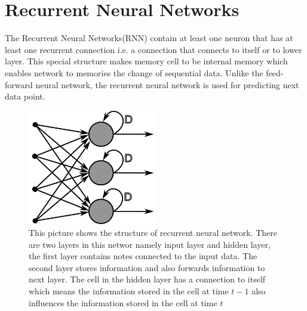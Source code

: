 \documentclass[officiallayout]{tktla}
\begin{document}
\section{Recurrent Neural Networks}
The Recurrent Neural Networks(RNN) contain at least one neuron that has at least one recurrent connection i.e. a connection that connects to itself or to lower layer. This special structure makes memory cell to be internal memory which enables network to memories the change of sequential data. Unlike the feed-forward neural network, the recurrent neural network is used for predicting next data point.

\begin{figure}[h!]
  \centering
    \includegraphics[width=0.5\textwidth]{recurrent_nn}
  \caption{This picture shows the structure of recurrent neural network. There are two layers in this networ namely input layer and hidden layer, the first layer contains notes connected to the input data. The second layer stores information and also forwards information to next layer. The cell in the hidden layer has a connection to itself which means the information stored in the cell at time $t-1$ also influences the information stored in the cell at time $t$}\label{feedforward_nn}
\end{figure}
\end{document}
